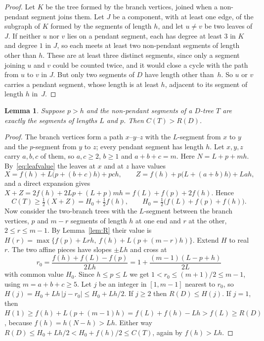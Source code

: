 \documentclass[11pt]{amsart}
\newtheorem{lemma}[thm]{Lemma}
\theoremstyle{definition}
\begin{document}
\begin{proof}
Let $K$ be the tree formed by the branch vertices, joined when a non-pendant segment joins them. Let $J$ be a
component, with at least one edge, of the subgraph of $K$ formed by the segments of length $h$, and let $u\ne v$ be two
leaves of $J$. If neither $u$ nor $v$ lies on a pendant segment, each has degree at least $3$ in $K$ and degree $1$ in
$J$, so each meets at least two non-pendant segments of length other than $h$. These are at least three distinct
segments, since only a segment joining $u$ and $v$ could be counted twice, and it would close a cycle with the path from
$u$ to $v$ in $J$. But only two segments of $D$ have length other than~$h$. So $u$ or $v$ carries a pendant segment,
whose length is at least $h$, adjacent to its segment of length $h$ in~$J$.
\end{proof}

\begin{lemma}\label{lem:three}
Suppose $p>h$ and the non-pendant segments of a $D$-tree $T$ are exactly the segments of lengths $L$ and $p$. Then
$C(T)>R(D)$.
\end{lemma}

\begin{proof}
The branch vertices form a path $x$--$y$--$z$ with the $L$-segment from $x$ to $y$ and the $p$-segment from $y$ to $z$;
every pendant segment has length $h$. Let $x,y,z$ carry $a,b,c$ of them, so $a,c\ge2$, $b\ge1$ and $a+b+c=m$. Here
$N=L+p+mh$. By~\eqref{eq:leafvalue} the leaves at $x$ and at $z$ have values
\[
X=f(h)+L\bigl(p+(b+c)h\bigr)+pch,\qquad Z=f(h)+p\bigl(L+(a+b)h\bigr)+Lah,
\]
and a direct expansion gives $X+Z=2f(h)+2Lp+(L+p)mh=f(L)+f(p)+2f(h)$. Hence
\begin{equation}\label{eq:avg}
C(T)\ge\tfrac12(X+Z)=H_0+\tfrac12f(h),\qquad H_0=\tfrac12\bigl(f(L)+f(p)+f(h)\bigr).
\end{equation}
Now consider the two-branch trees with the $L$-segment between the branch vertices, $p$ and $m-r$ segments of length
$h$ at one end and $r$ at the other, $2\le r\le m-1$. By Lemma~\ref{lem:R} their value is
$H(r)=\max\{f(p)+Lrh,\ f(h)+L(p+(m-r)h)\}$. Extend $H$ to real $r$. The two affine pieces have slopes $\pm Lh$ and
cross at
\[
r_0=\frac{f(h)+f(L)-f(p)}{2Lh}=1+\frac{(m-1)(L-p+h)}{2L}
\]
with common value $H_0$. Since $h\le p\le L$ we get $1<r_0\le(m+1)/2\le m-1$, using $m=a+b+c\ge5$. Let $j$ be an
integer in $[1,m-1]$ nearest to $r_0$, so $H(j)=H_0+Lh\,|j-r_0|\le H_0+Lh/2$. If $j\ge2$ then $R(D)\le H(j)$. If
$j=1$, then $H(1)\ge f(h)+L(p+(m-1)h)=f(L)+f(h)-Lh>f(L)\ge R(D)$, because $f(h)=h(N-h)>Lh$. Either way
$R(D)\le H_0+Lh/2<H_0+f(h)/2\le C(T)$, again by $f(h)>Lh$.
\end{proof}
\end{document}

